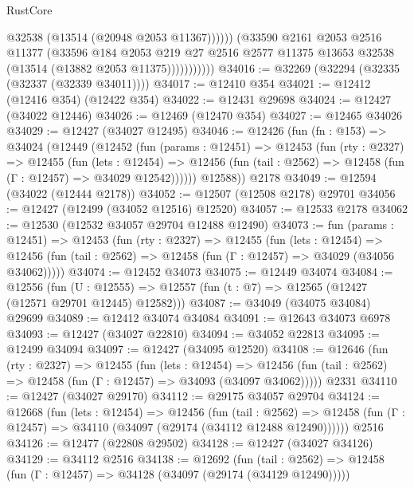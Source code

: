 \begin{lexlean}{RustCore}
\begin{coremodule}
                          @32538
                          (@13514 (@20948 @2053 @11367))))))
                  (@33590
                    @2161
                    @2053
                    @2516
                    @11377
                    (@33596
                      @184
                      @2053
                      @219
                      @27
                      @2516
                      @2577
                      @11375
                      @13653
                      @32538
                      (@13514 (@13882 @2053 @11375)))))))))))
@34016 := @32269 (@32294 (@32335 (@32337 (@32339 @34011))))
@34017 := @12410 @354
@34021 := @12412 (@12416 @354) (@12422 @354)
@34022 := @12431 @29698
@34024 := @12427 (@34022 @12446)
@34026 := @12469 (@12470 @354)
@34027 := @12465 @34026
@34029 := @12427 (@34027 @12495)
@34046 := @12426
    (fun (fn : @153) =>
    @34024
      (@12449
        (@12452
          (fun (params : @12451) =>
          @12453
            (fun (rty : @2327) =>
            @12455
              (fun (lets : @12454) =>
              @12456 (fun (tail : @2562) => @12458 (fun (Γ : @12457) => @34029 @12542))))))
        @12588))
    @2178
@34049 := @12594 (@34022 (@12444 @2178))
@34052 := @12507 (@12508 @2178) @29701
@34056 := @12427 (@12499 (@34052 @12516) @12520)
@34057 := @12533 @2178
@34062 := @12530 (@12532 @34057 @29704 @12488 @12490)
@34073 := fun (params : @12451) =>
  @12453
    (fun (rty : @2327) =>
    @12455
      (fun (lets : @12454) =>
      @12456 (fun (tail : @2562) => @12458 (fun (Γ : @12457) => @34029 (@34056 @34062)))))
@34074 := @12452 @34073
@34075 := @12449 @34074
@34084 := @12556
    (fun (U : @12555) => @12557 (fun (t : @7) => @12565 (@12427 (@12571 @29701 @12445) @12582)))
@34087 := @34049 (@34075 @34084) @29699
@34089 := @12412 @34074 @34084
@34091 := @12643 @34073 @6978
@34093 := @12427 (@34027 @22810)
@34094 := @34052 @22813
@34095 := @12499 @34094
@34097 := @12427 (@34095 @12520)
@34108 := @12646
    (fun (rty : @2327) =>
    @12455
      (fun (lets : @12454) =>
      @12456 (fun (tail : @2562) => @12458 (fun (Γ : @12457) => @34093 (@34097 @34062)))))
    @2331
@34110 := @12427 (@34027 @29170)
@34112 := @29175 @34057 @29704
@34124 := @12668
    (fun (lets : @12454) =>
    @12456
      (fun (tail : @2562) =>
      @12458 (fun (Γ : @12457) => @34110 (@34097 (@29174 (@34112 @12488 @12490))))))
    @2516
@34126 := @12477 (@22808 @29502)
@34128 := @12427 (@34027 @34126)
@34129 := @34112 @2516
@34138 := @12692
    (fun (tail : @2562) => @12458 (fun (Γ : @12457) => @34128 (@34097 (@29174 (@34129 @12490)))))

\end{coremodule}
\end{lexlean}
